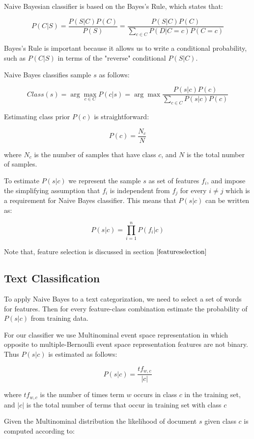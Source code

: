 \documentclass{report}
\begin{document}
Naive Bayesian classifier is based on the Bayes's Rule, which states that:

\[
P(C|S) = \frac{P (S|C) P (C)}{P(S)} = \frac{P (S|C) P (C)}{\sum_{c \in C} P(D|C=c)P(C=c)}
\]

Bayes's Rule is important because it allows us to write a conditional probability, such as $P(C|S)$ in terms of the "reverse" conditional 
$P(S|C)$.

Naive Bayes classifies sample $s$ as follows:

\[
Class(s)  = \arg \max_{c \in C} P(c|s) = \arg \max \frac{P(s|c)P(c)}{\sum_{c \in C} P(s|c)P(c)}
\]

Estimating class prior $P(c)$ is straightforward:

\[
P(c) = \frac{N_c}{N}
\]

where $N_c$ is the number of samples that have class $c$, and $N$ is the total number of samples.

To estimate $P(s|c)$ we represent the sample $s$ as set of features $f_i$, and impose the simplifying assumption that $f_i$ is independent from $f_j$  for every $i \neq j$ which is a requirement for Naive Bayes classifier. This means that $P(s|c)$ can be written as:

\[
P(s|c) = \prod_{i=1}^n P(f_i|c)
\]

Note that, feature selection is discussed in section  $\ref{featureselection}$

\subsection{Text Classification}

To apply Naive Bayes to a text categorization, we need to select a set of words for features. Then for every feature-class combination estimate the probability of $P(s|c)$ from training data.

For our classifier we use Multinominal event space representation in which opposite to multiple-Bernoulli event space representation features are not binary\cite{Croft:2010:SEI}. Thus $P(s|c)$ is estimated as follows:

\[
P(s|c) = \frac{tf_{w,c}}{|c|}
\]

where $tf_{w,c}$ is the number of times term $w$ occurs in class $c$ in the training set, and $|c|$ is the total number of terms that occur in training set with class $c$

Given the Multinominal distribution the likelihood of document $s$ given class $c$ is computed according to:
\end{document}
